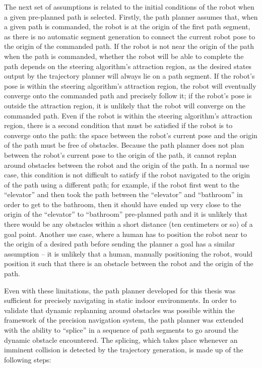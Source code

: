 The next set of assumptions is related to the initial conditions of the robot when a given pre-planned path is selected. Firstly, the path planner assumes that, when a given path is commanded, the robot is at the origin of the first path segment, as there is no automatic segment generation to connect the current robot pose to the origin of the commanded path. If the robot is not near the origin of the path when the path is commanded, whether the robot will be able to complete the path depends on the steering algorithm's attraction region, as the desired states output by the trajectory planner will always lie on a path segment. If the robot's pose is within the steering algorithm's attraction region, the robot will eventually converge onto the commanded path and precisely follow it; if the robot's pose is outside the attraction region, it is unlikely that the robot will converge on the commanded path. Even if the robot is within the steering algorithm's attraction region, there is a second condition that must be satisfied if the robot is to converge onto the path: the space between the robot's current pose and the origin of the path must be free of obstacles. Because the path planner does not plan between the robot's current pose to the origin of the path, it cannot replan around obstacles between the robot and the origin of the path. In a normal use case, this condition is not difficult to satisfy if the robot navigated to the origin of the path using a different path; for example, if the robot first went to the ``elevator'' and then took the path between the ``elevator'' and ``bathroom'' in order to get to the bathroom, then it should have ended up very close to the origin of the ``elevator'' to ``bathroom'' pre-planned path and it is unlikely that there would be any obstacles within a short distance (ten centimeters or so) of a goal point. Another use case, where a human has to position the robot near to the origin of a desired path before sending the planner a goal has a similar assumption -- it is unlikely that a human, manually positioning the robot, would position it such that there is an obstacle between the robot and the origin of the path.

Even with these limitations, the path planner developed for this thesis was sufficient for precisely navigating in static indoor environments. In order to validate that dynamic replanning around obstacles was possible within the framework of the precision navigation system, the path planner was extended with the ability to ``splice'' in a sequence of path segments to go around the dynamic obstacle encountered. The splicing, which takes place whenever an imminent collision is detected by the trajectory generation, is made up of the following steps:

